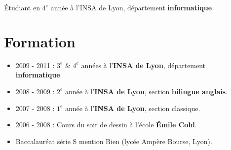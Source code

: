 
\pagestyle{empty}
\usepackage{eso-pic}


\begin{minipage}{0.6\textwidth}
\end{minipage}
\begin{minipage}{0.35\textwidth}
\end{minipage}


\vspace{30pt} 


{ \center \Large{Étudiant en $4^e$ année à l'INSA de Lyon, département \textbf{informatique} } }
\large
\section*{Formation }
	\begin{itemize}
		\item{2009 - 2011} : $3^e$ \& $4^e$ années à l'\textbf{INSA de Lyon}, département \textbf{informatique}.
		\item{2008 - 2009} : $2^e$ année à l'\textbf{INSA de Lyon}, section \textbf{bilingue anglais}.
		\item{2007 - 2008} : $1^e$ année à l'\textbf{INSA de Lyon}, section classique.
		\item{2006 - 2008} : Cours du soir de dessin à l'école \textbf{Émile Cohl}.
		\item Baccalauréat série S mention Bien (lycée Ampère Bourse, Lyon).
	\end{itemize}

